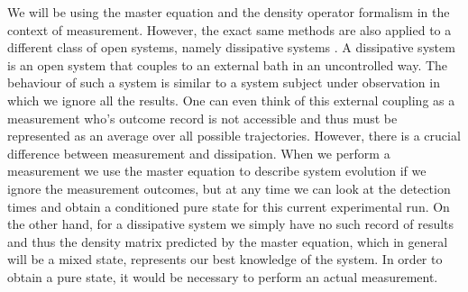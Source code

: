 We will be using the master equation and the density operator
formalism in the context of measurement. However, the exact same
methods are also applied to a different class of open systems, namely
dissipative systems \cite{QuantumNoise}. A dissipative system is an
open system that couples to an external bath in an uncontrolled
way. The behaviour of such a system is similar to a system subject
under observation in which we ignore all the results. One can even
think of this external coupling as a measurement who's outcome record
is not accessible and thus must be represented as an average over all
possible trajectories. However, there is a crucial difference between
measurement and dissipation. When we perform a measurement we use the
master equation to describe system evolution if we ignore the
measurement outcomes, but at any time we can look at the detection times
and obtain a conditioned pure state for this current experimental
run. On the other hand, for a dissipative system we simply have no
such record of results and thus the density matrix predicted by the
master equation, which in general will be a mixed state, represents
our best knowledge of the system. In order to obtain a pure state, it
would be necessary to perform an actual measurement.

